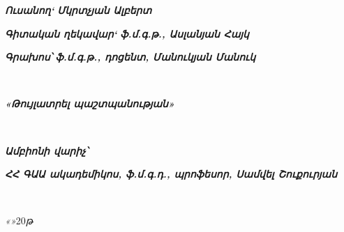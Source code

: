 {
	\large
	\raggedright
	\textbf{\textit{Ուսանող`}} \underline{\hspace{5cm}} \textbf{\textit{Մկրտչյան Ալբերտ}} \\
	\small
}

\vspace{2cm}
{
	\large
	\raggedright
	\textbf{\textit{Գիտական ղեկավար`}} \underline{\hspace{5cm}} \textbf{\textit{ֆ.մ.գ.թ., Ասլանյան Հայկ}} \\
	\small
}

\vspace{2cm}
{
	\large
	\raggedright
	\textbf{\textit{Գրախոս՝}} \underline{\hspace{5cm}} \textbf{\textit{ֆ.մ.գ.թ., դոցենտ, Մանուկյան Մանուկ}} \\
	\small
} \\


\vfill
{
	\large
	\raggedright
	\textbf{\textit{«Թույլատրել պաշտպանության»}}
} \\

\vspace{2cm}
{
	\large
	\raggedright
	\parbox[t]{3.9cm}{\textbf{\textit{Ամբիոնի վարիչ՝}}}
	\parbox[t]{2cm}{\underline{\hspace{4cm}} \small{}} \hfill
	\parbox[t]{8cm}{\raggedright\textbf{\textit{ՀՀ ԳԱԱ ակադեմիկոս, ֆ.մ.գ.դ., պրոֆեսոր, Սամվել Շուքուրյան}}} \\
}

\vspace{1.5cm}
{
	\raggedright
	\large
	\textit{«}\underline{\hspace{1.5cm}}\textit{»}\underline{\hspace{2.5cm}}20\underline{\hspace{0.5cm}}\textit{թ} \\
}

\newpage